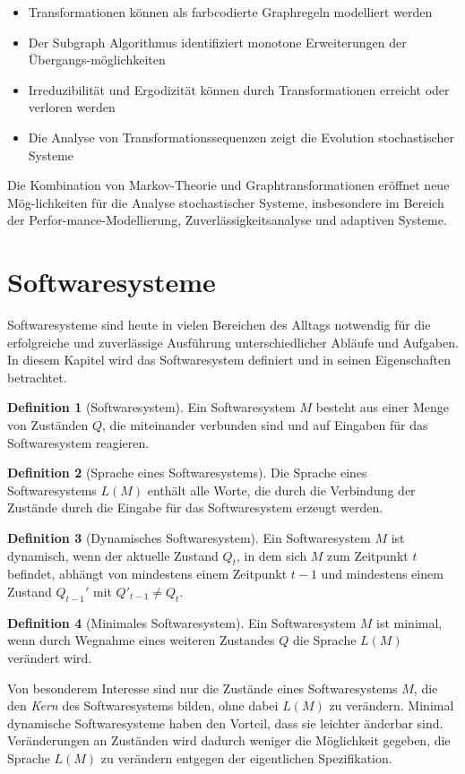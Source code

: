 \documentclass[a4paper,12pt]{article}
\theoremstyle{definition}
\newtheorem{definition}{Definition}
\begin{document}
\begin{itemize}
	\item[-] Transformationen können als farbcodierte Graphregeln modelliert werden
	\item[-] Der Subgraph Algorithmus identifiziert monotone Erweiterungen der Übergangs-möglichkeiten
	\item[-] Irreduzibilität und Ergodizität können durch Transformationen erreicht oder verloren werden
	\item[-] Die Analyse von Transformationssequenzen zeigt die Evolution stochastischer Systeme
\end{itemize}

Die Kombination von Markov-Theorie und Graphtransformationen eröffnet neue Mög-lichkeiten für die Analyse stochastischer Systeme, insbesondere im Bereich der Perfor-mance-Modellierung, Zuverlässigkeitsanalyse und adaptiven Systeme.


\section{Softwaresysteme}

Softwaresysteme sind heute in vielen Bereichen des Alltags notwendig für die erfolgreiche und zuverlässige Ausführung unterschiedlicher Abläufe und Aufgaben. In diesem Kapitel wird das Softwaresystem definiert und in seinen Eigenschaften betrachtet.

\begin{definition}[Softwaresystem]
	Ein Softwaresystem $M$ besteht aus einer Menge von Zuständen $Q$, die miteinander verbunden sind und auf Eingaben für das Softwaresystem reagieren.
\end{definition}

\begin{definition}[Sprache eines Softwaresystems]
	Die Sprache eines Softwaresystems $L(M)$ enthält alle Worte, die durch die Verbindung der Zustände durch die Eingabe für das Softwaresystem erzeugt werden.
\end{definition}

\begin{definition}[Dynamisches Softwaresystem]
	Ein Softwaresystem $M$ ist dynamisch, wenn der aktuelle Zustand $Q_{t}$, in dem sich $M$ zum Zeitpunkt $t$ befindet, abhängt von mindestens einem Zeitpunkt $t-1$ und mindestens einem Zustand $Q_{t-1}'$ mit $Q'_{t-1} \neq Q_{t}$.
\end{definition}

\begin{definition}[Minimales Softwaresystem]
	Ein Softwaresystem $M$ ist minimal, wenn durch Wegnahme eines weiteren Zustandes $Q$ die Sprache $L(M)$ verändert wird.
\end{definition}
Von besonderem Interesse sind nur die Zustände eines Softwaresystems $M$, die den \textit{Kern} des Softwaresystems bilden, ohne dabei $L(M)$ zu verändern. Minimal dynamische Softwaresysteme haben den Vorteil, dass sie leichter änderbar sind. Veränderungen an Zuständen wird dadurch weniger die Möglichkeit gegeben, die Sprache $L(M)$ zu verändern entgegen der eigentlichen Spezifikation.
\end{document}

